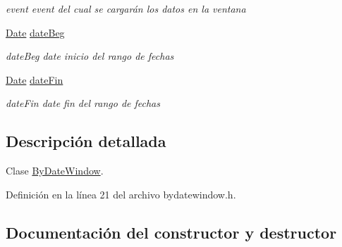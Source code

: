 \begin{DoxyCompactItemize}
\begin{DoxyCompactList}\small\item\em event event del cual se cargarán los datos en la ventana \end{DoxyCompactList}\item 
\hyperlink{class_date}{Date} \hyperlink{class_by_date_window_ae5c7c0a683a62d39adab2cb970191a36}{date\+Beg}\hypertarget{class_by_date_window_ae5c7c0a683a62d39adab2cb970191a36}{}\label{class_by_date_window_ae5c7c0a683a62d39adab2cb970191a36}

\begin{DoxyCompactList}\small\item\em date\+Beg date inicio del rango de fechas \end{DoxyCompactList}\item 
\hyperlink{class_date}{Date} \hyperlink{class_by_date_window_a59f3946fff2b2b8333a42d7b2beecdca}{date\+Fin}\hypertarget{class_by_date_window_a59f3946fff2b2b8333a42d7b2beecdca}{}\label{class_by_date_window_a59f3946fff2b2b8333a42d7b2beecdca}

\begin{DoxyCompactList}\small\item\em date\+Fin date fin del rango de fechas \end{DoxyCompactList}\end{DoxyCompactItemize}


\subsection{Descripción detallada}
Clase \hyperlink{class_by_date_window}{By\+Date\+Window}. 

Definición en la línea 21 del archivo bydatewindow.\+h.



\subsection{Documentación del constructor y destructor}
